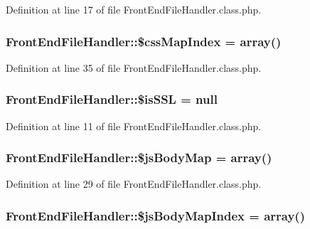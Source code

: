 Definition at line 17 of file Front\+End\+File\+Handler.\+class.\+php.

\hypertarget{classFrontEndFileHandler_a61df1d725cd1884fd0a260dec738a4b7}{
\subsubsection[{\$css\+Map\+Index}]{\setlength{\rightskip}{0pt plus 5cm}Front\+End\+File\+Handler\+::\$css\+Map\+Index = array()}}\label{classFrontEndFileHandler_a61df1d725cd1884fd0a260dec738a4b7}


Definition at line 35 of file Front\+End\+File\+Handler.\+class.\+php.

\hypertarget{classFrontEndFileHandler_a1e709934ab4023d10850268064d771bc}{
\subsubsection[{\$is\+S\+S\+L}]{\setlength{\rightskip}{0pt plus 5cm}Front\+End\+File\+Handler\+::\$is\+S\+S\+L = null\hspace{0.3cm}{\ttfamily [static]}}}\label{classFrontEndFileHandler_a1e709934ab4023d10850268064d771bc}


Definition at line 11 of file Front\+End\+File\+Handler.\+class.\+php.

\hypertarget{classFrontEndFileHandler_ad03de614a088bc386c393543a3cd9aed}{
\subsubsection[{\$js\+Body\+Map}]{\setlength{\rightskip}{0pt plus 5cm}Front\+End\+File\+Handler\+::\$js\+Body\+Map = array()}}\label{classFrontEndFileHandler_ad03de614a088bc386c393543a3cd9aed}


Definition at line 29 of file Front\+End\+File\+Handler.\+class.\+php.

\hypertarget{classFrontEndFileHandler_aba61415d3f993f1f6b9cddc0024f50b1}{
\subsubsection[{\$js\+Body\+Map\+Index}]{\setlength{\rightskip}{0pt plus 5cm}Front\+End\+File\+Handler\+::\$js\+Body\+Map\+Index = array()}}\label{classFrontEndFileHandler_aba61415d3f993f1f6b9cddc0024f50b1}


